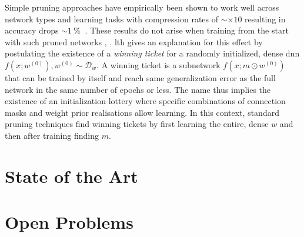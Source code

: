 \documentclass[12pt,fleqn,twocolumn]{article}
\newcommand{\pro}{\ensuremath{\:\%{}\:}}
\begin{document}
Simple pruning approaches have empirically been shown to work well across network types and learning tasks with compression rates of $\sim \times 10$ resulting in accuracy drops $\sim 1\pro$ \cite[Fig. 7] {bla2020state}.
These results do not arise when training from the start with such pruned networks \cite[Chap. 4]{li2016filt}, \cite[Chap. 3.3]{han2015learning}.
\acrshort{lth} gives an explanation for this effect by postulating the existence of a \emph{winning ticket} for a randomly initialized, dense \acrshort{dnn} $f(x;w^{(0)}), w^{(0)}\sim \mathcal D_w$.
A winning ticket is a subnetwork $f(x;m\odot w^{(0)})$ that can be trained by itself and reach same generalization error as the full network in the same number of epochs or less.
The name thus implies the existence of an initialization lottery where specific combinations of connection masks and weight prior realisations allow learning.
In this context, standard pruning techniques find winning tickets by first learning the entire, dense $w$ and then after training finding $m$.

\section*{State of the Art}%
\section*{Open Problems}%
\label{sec:Open Problems}

\clearpage
\renewcommand*{\bibfont}{\normalfont\footnotesize}
\printbibliography[heading=bibintoc]

\printglossary[type=\acronymtype]
\end{document}
